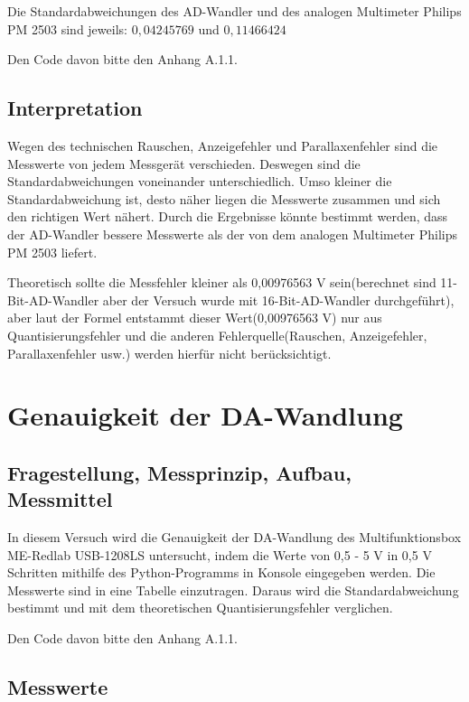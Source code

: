 \documentclass[12pt, oneside, a4paper, \docLanguage]{report}
\begin{document}
\qquad Die Standardabweichungen des AD-Wandler und des analogen Multimeter Philips PM 2503 sind jeweils: $0,04245769$ und $0,11466424$





Den Code davon bitte den Anhang A.1.1.

\section{Interpretation}
\label{chap:VERSUCH_2_INTERPRETATION}
\qquad Wegen des technischen Rauschen, Anzeigefehler und Parallaxenfehler sind die Messwerte von jedem Messgerät verschieden. Deswegen sind die Standardabweichungen voneinander unterschiedlich. Umso kleiner die Standardabweichung ist, desto näher liegen die Messwerte zusammen und sich den richtigen Wert nähert. Durch die Ergebnisse könnte bestimmt werden, dass der AD-Wandler bessere Messwerte als der von dem analogen Multimeter Philips PM 2503 liefert.

\qquad Theoretisch sollte die Messfehler kleiner als 0,00976563 V sein(berechnet sind 11-Bit-AD-Wandler aber der Versuch wurde mit 16-Bit-AD-Wandler durchgeführt), aber laut der Formel entstammt dieser Wert(0,00976563 V) nur aus Quantisierungsfehler und die anderen Fehlerquelle(Rauschen, Anzeigefehler, Parallaxenfehler usw.) werden hierfür nicht berücksichtigt.



%
%
\chapter{Genauigkeit der DA-Wandlung}
\section{Fragestellung, Messprinzip, Aufbau, Messmittel}
\qquad In diesem Versuch wird die Genauigkeit der DA-Wandlung des Multifunktionsbox ME-Redlab USB-1208LS untersucht, indem die Werte von 0,5 - 5 V in 0,5 V Schritten mithilfe des Python-Programms in Konsole eingegeben werden. Die Messwerte sind in eine Tabelle einzutragen. Daraus wird die Standardabweichung bestimmt und mit dem theoretischen Quantisierungsfehler verglichen.

Den Code davon bitte den Anhang A.1.1.

\section{Messwerte}
\label{chap:VERSUCH_3_MESSWERTE}
\end{document}
